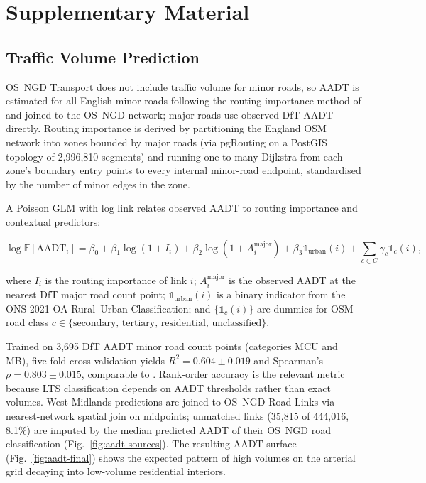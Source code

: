 \chapter{Supplementary Material}
\label{app:supplementary}

\section{Traffic Volume Prediction}
\label{app:traffic-volume}

OS~NGD Transport does not include traffic volume for minor roads, so AADT is estimated for all English minor roads following the routing-importance method of \parencite{morley2016} and joined to the OS~NGD network; major roads use observed DfT AADT directly. Routing importance is derived by partitioning the England OSM network into zones bounded by major roads (via pgRouting on a PostGIS topology of 2,996,810 segments) and running one-to-many Dijkstra from each zone's boundary entry points to every internal minor-road endpoint, standardised by the number of minor edges in the zone.

A Poisson GLM with log link relates observed AADT to routing importance and contextual predictors:

\begin{equation}
\label{eq:aadt-glm}
\log \mathbb{E}[\text{AADT}_i] 
= \beta_0 
+ \beta_1 \log(1 + I_i) 
+ \beta_2 \log(1 + A^{\text{major}}_i) 
+ \beta_3 \mathbb{1}_{\text{urban}}(i) 
+ \sum_{c \in C} \gamma_c \mathbb{1}_{c}(i),
\end{equation}

\noindent where $I_i$ is the routing importance of link $i$; $A^{\text{major}}_i$ is the observed AADT at the nearest DfT major road count point; $\mathbb{1}_{\text{urban}}(i)$ is a binary indicator from the ONS 2021 OA Rural--Urban Classification; and $\{\mathbb{1}_c(i)\}$ are dummies for OSM road class $c \in \{\text{secondary, tertiary, residential, unclassified}\}$.

Trained on 3,695 DfT AADT minor road count points (categories MCU and MB), five-fold cross-validation yields $R^2 = 0.604 \pm 0.019$ and Spearman's $\rho = 0.803 \pm 0.015$, comparable to \parencite{morley2016}. Rank-order accuracy is the relevant metric because LTS classification depends on AADT thresholds rather than exact volumes. West Midlands predictions are joined to OS~NGD Road Links via nearest-network spatial join on midpoints; unmatched links (35,815 of 444,016, 8.1\%) are imputed by the median predicted AADT of their OS~NGD road classification (Fig.~\ref{fig:aadt-sources}). The resulting AADT surface (Fig.~\ref{fig:aadt-final}) shows the expected pattern of high volumes on the arterial grid decaying into low-volume residential interiors.

